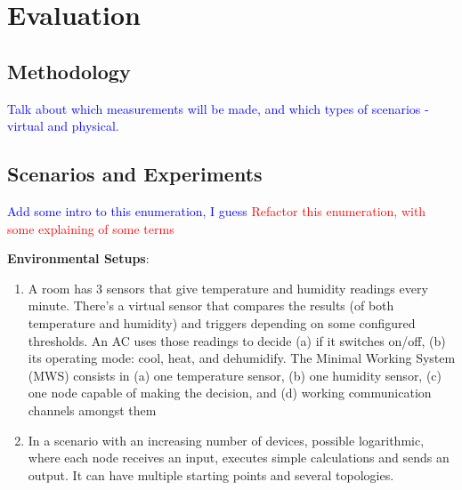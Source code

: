 \chapter{Evaluation} \label{chap:evaluation} \minitoc

\section*{}

\section{Methodology}\label{sec:methodology}

\textcolor{blue}{Talk about which measurements will be made, and which types of scenarios - virtual and physical.}

\section{Scenarios and Experiments}\label{sec:scenarios_experiments}

\textcolor{blue}{Add some intro to this enumeration, I guess}
\textcolor{red}{Refactor this enumeration, with some explaining of some terms}

\textbf{Environmental Setups}:
\begin{enumerate}
    \item A room has 3 sensors that give temperature and humidity readings every minute. There’s a virtual sensor that compares the results (of both temperature and humidity) and triggers depending on some configured thresholds. An AC uses those readings to decide (a) if it switches on/off, (b) its operating mode: cool, heat, and dehumidify. The Minimal Working System (MWS) consists in (a) one temperature sensor, (b) one humidity sensor, (c) one node capable of making the decision, and (d) working communication channels amongst them
    \item In a scenario with an increasing number of devices, possible logarithmic, where each node receives an input, executes simple calculations and sends an output. It can have multiple starting points and several topologies.
\end{enumerate}

